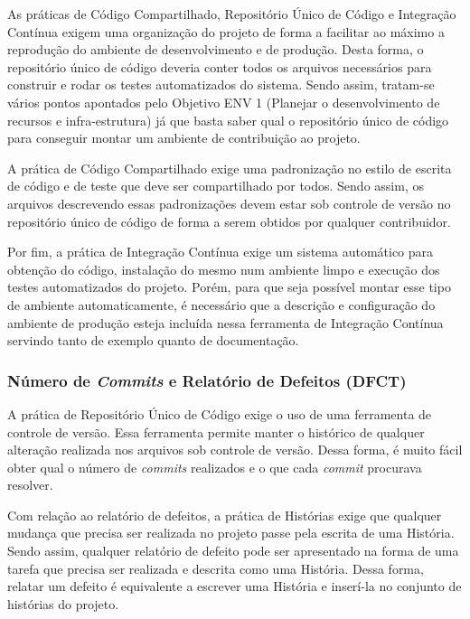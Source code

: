 As práticas de Código Compartilhado, Repositório Único de Código e
Integração Contínua exigem uma organização do projeto de forma a
facilitar ao máximo a reprodução do ambiente de desenvolvimento e de
produção. Desta forma, o repositório único de código deveria conter
todos os arquivos necessários para construir e rodar os testes
automatizados do sistema. Sendo assim, tratam-se vários pontos
apontados pelo Objetivo ENV 1 (Planejar o desenvolvimento de recursos
e infra-estrutura) já que basta saber qual o repositório único de
código para conseguir montar um ambiente de contribuição ao projeto.

A prática de Código Compartilhado exige uma padronização no estilo de
escrita de código e de teste que deve ser compartilhado por
todos. Sendo assim, os arquivos descrevendo essas padronizações devem
estar sob controle de versão no repositório único de código de forma a
serem obtidos por qualquer contribuidor.

Por fim, a prática de Integração Contínua exige um sistema automático
para obtenção do código, instalação do mesmo num ambiente limpo e
execução dos testes automatizados do projeto. Porém, para que seja
possível montar esse tipo de ambiente automaticamente, é necessário
que a descrição e configuração do ambiente de produção esteja incluída
nessa ferramenta de Integração Contínua servindo tanto de exemplo
quanto de documentação.

\subsubsection{Número de \textit{Commits} e Relatório de Defeitos
  (DFCT)}
\label{sec:+dfct}

A prática de Repositório Único de Código exige o uso de uma ferramenta
de controle de versão. Essa ferramenta permite manter o histórico de
qualquer alteração realizada nos arquivos sob controle de
versão. Dessa forma, é muito fácil obter qual o número de
\textit{commits} realizados e o que cada \textit{commit} procurava
resolver.

Com relação ao relatório de defeitos, a prática de Histórias exige que
qualquer mudança que precisa ser realizada no projeto passe pela
escrita de uma História. Sendo assim, qualquer relatório de defeito
pode ser apresentado na forma de uma tarefa que precisa ser realizada
e descrita como uma História. Dessa forma, relatar um defeito é
equivalente a escrever uma História e inserí-la no conjunto de
histórias do projeto.

